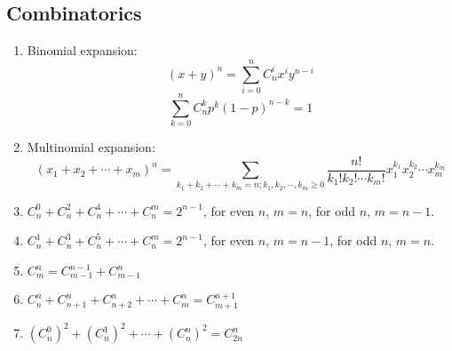 \documentclass[a4paper]{article}
\begin{document}
\subsection{Combinatorics}
	\begin{enumerate}
	\item Binomial expansion:
$$(x+y)^n=\sum_{i=0}^nC_n^ix^iy^{n-i}$$
$$\sum_{k=0}^nC_n^kp^k(1-p)^{n-k}=1$$
	\item Multinomial expansion:
$$(x_1+x_2+\cdots+x_m)^n=\sum\limits_{k_1+k_2+\cdots+k_m=n;k_1,k_2,\cdots,k_m\geq0}\frac{n!}{k_1!k_2!\cdots k_m!}x_1^{k_1}x_2^{k_2}\cdots x_m^{k_m}$$
	\item $C_n^0+C_n^2+C_n^4+\cdots+C_n^m=2^{n-1}$, for even $n$, $m=n$, for odd $n$, $m=n-1$.
	\item $C_n^1+C_n^3+C_n^5+\cdots+C_n^m=2^{n-1}$, for even $n$, $m=n-1$, for odd $n$, $m=n$.
	\item $C_m^n=C_{m-1}^{n-1}+C_{m-1}^n$
	\item $C_{n}^{n}+C_{n+1}^{n}+C_{n+2}^{n}+\cdots+C_{m}^{n}=C_{m+1}^{n+1}$
	\item $(C_n^0)^2+(C_n^1)^2+\cdots+(C_n^n)^2=C_{2n}^n$
	\end{enumerate}
\end{document}

